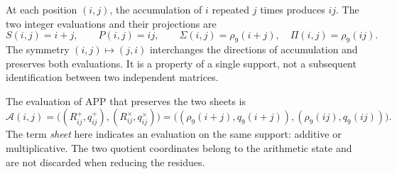 At each position \((i,j)\), the accumulation of \(i\) repeated \(j\) times produces \(ij\). The two integer evaluations and their projections are
\[
 S(i,j)=i+j,\qquad P(i,j)=ij,\qquad
 \Sigma(i,j)=\rho_9(i+j),\quad \Pi(i,j)=\rho_9(ij).
\]
The symmetry \((i,j)\mapsto(j,i)\) interchanges the directions of accumulation and preserves both evaluations. It is a property of a single support, not a subsequent identification between two independent matrices.

\begin{definition}
The evaluation of APP that preserves the two sheets is
\begin{equation}
 \mathcal A(i,j)=
 \bigl((R^+_{ij},q^+_{ij}),(R^\times_{ij},q^\times_{ij})\bigr)
 =\bigl((\rho_9(i+j),q_9(i+j)),(\rho_9(ij),q_9(ij))\bigr).
 \label{x_reciprocidad:eq:app-levantada}
\end{equation}
The term \emph{sheet} here indicates an evaluation on the same support: additive or multiplicative. The two quotient coordinates belong to the arithmetic state and are not discarded when reducing the residues.
\end{definition}



